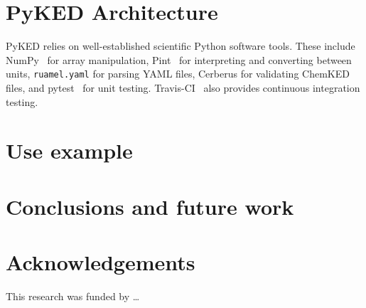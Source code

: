 \documentclass[12pt]{ussci}
\newcommand\ck{ChemKED}
\newcommand\pk{PyKED}
\begin{document}
\section{PyKED Architecture}
%

\pk{} relies on well-established scientific Python software tools.
These include NumPy~\cite{vanderWalt:2011np} for array manipulation, Pint~\cite{Grecco2016} for
interpreting and converting between units, \texttt{ruamel.yaml} for parsing YAML files,
Cerberus for validating \ck{} files,
and pytest~\cite{pytest:3.0.1} for unit testing.
Travis-CI~\cite{Travis2016} also provides continuous integration testing.

\section{Use example}
%


\section{Conclusions and future work}
%



\section{Acknowledgements}
This research was funded by \ldots
{}


\printbibliography
\end{document}
